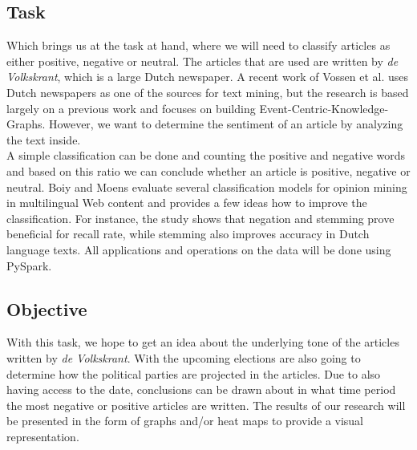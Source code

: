 \subsection{Task}
Which brings us at the task at hand, where we will need to classify articles as either positive, negative or neutral. The articles that are used are written by {\it de Volkskrant}\cite{volkskrant}, which is a large Dutch newspaper. A recent work of Vossen et al.\cite{vossen_newsreader:_2016} uses Dutch newspapers as one of the sources for text mining, but the research is based largely on a previous work\cite{vossen_cross-lingual_2012} and focuses on building Event-Centric-Knowledge-Graphs. However, we want to determine the sentiment of an article by analyzing the text inside. \\

A simple classification can be done and counting the positive and negative words and based on this ratio we can conclude whether an article is positive, negative or neutral. Boiy and Moens\cite{boiy_machine_2009} evaluate several classification models for opinion mining in multilingual Web content and provides a few ideas how to improve the classification. For instance, the study shows that negation and stemming prove beneficial for recall rate, while stemming also improves accuracy in Dutch language texts. All applications and operations on the data will be done using PySpark.\\

\subsection{Objective}
With this task, we hope to get an idea about the underlying tone of the articles written by {\it de Volkskrant}.
With the upcoming elections are also going to determine how the political parties are projected in the articles. Due to also having access to the date, conclusions can be drawn about in what time period the most negative or positive articles are written. The results of our research will be presented in the form of graphs and/or heat maps to provide a visual representation. \\